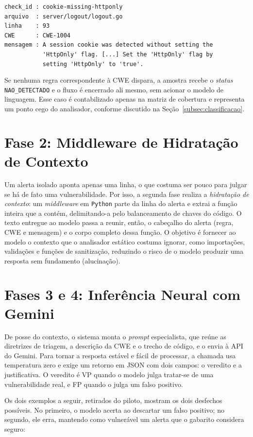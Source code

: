 \begin{verbatim}
check_id : cookie-missing-httponly
arquivo  : server/logout/logout.go
linha    : 93
CWE      : CWE-1004
mensagem : A session cookie was detected without setting the
           'HttpOnly' flag. [...] Set the 'HttpOnly' flag by
           setting 'HttpOnly' to 'true'.
\end{verbatim}

Se nenhuma regra correspondente à CWE dispara, a amostra recebe o \textit{status} \texttt{NAO\_DETECTADO} e o fluxo é encerrado ali mesmo, sem acionar o modelo de linguagem. Esse caso é contabilizado apenas na matriz de cobertura e representa um ponto cego do analisador, conforme discutido na Seção~\ref{subsec:classificacao}.

\section{Fase 2: Middleware de Hidratação de Contexto}

Um alerta isolado aponta apenas uma linha, o que costuma ser pouco para julgar se há de fato uma vulnerabilidade. Por isso, a segunda fase realiza a \textit{hidratação de contexto}: um \textit{middleware} em \texttt{Python} parte da linha do alerta e extrai a função inteira que a contém, delimitando-a pelo balanceamento de chaves do código. O texto entregue ao modelo passa a reunir, então, o cabeçalho do alerta (regra, CWE e mensagem) e o corpo completo dessa função. O objetivo é fornecer ao modelo o contexto que o analisador estático costuma ignorar, como importações, validações e funções de sanitização, reduzindo o risco de o modelo produzir uma resposta sem fundamento (alucinação).

\section{Fases 3 e 4: Inferência Neural com Gemini}

De posse do contexto, o sistema monta o \textit{prompt} especialista, que reúne as diretrizes de triagem, a descrição da CWE e o trecho de código, e o envia à API do Gemini. Para tornar a resposta estável e fácil de processar, a chamada usa temperatura zero e exige um retorno em JSON com dois campos: o veredito e a justificativa. O veredito é VP quando o modelo julga tratar-se de uma vulnerabilidade real, e FP quando o julga um falso positivo.

Os dois exemplos a seguir, retirados do piloto, mostram os dois desfechos possíveis. No primeiro, o modelo acerta ao descartar um falso positivo; no segundo, ele erra, mantendo como vulnerável um alerta que o gabarito considera seguro:


